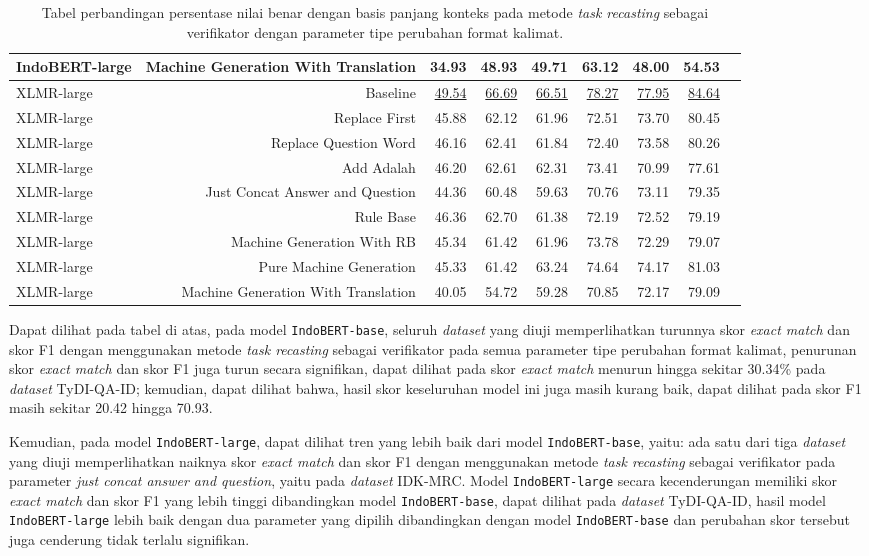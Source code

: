 \begin{table}[H]
\begin{tabular}{lrrrrrrrr}
IndoBERT-large &Machine Generation With Translation &34.93 &48.93 &49.71 &63.12 &48.00 &54.53 \\
\hline
XLMR-large &Baseline &\underline{49.54} &\underline{66.69} &\underline{66.51} &\underline{78.27} &\underline{77.95} &\underline{84.64} \\
XLMR-large &Replace First &45.88 &62.12 &61.96 &72.51 &73.70 &80.45 \\
XLMR-large &Replace Question Word &46.16 &62.41 &61.84 &72.40 &73.58 &80.26 \\
XLMR-large &Add Adalah &46.20 &62.61 &62.31 &73.41 &70.99 &77.61 \\
XLMR-large &Just Concat Answer and Question &44.36 &60.48 &59.63 &70.76 &73.11 &79.35 \\
XLMR-large &Rule Base &46.36 &62.70 &61.38 &72.19 &72.52 &79.19 \\
XLMR-large &Machine Generation With RB &45.34 &61.42 &61.96 &73.78 &72.29 &79.07 \\
XLMR-large &Pure Machine Generation &45.33 &61.42 &63.24 &74.64 &74.17 &81.03 \\
XLMR-large &Machine Generation With Translation &40.05 &54.72 &59.28 &70.85 &72.17 &79.09 \\
\bottomrule
\end{tabular}
\caption{Tabel perbandingan persentase nilai benar dengan basis panjang konteks pada metode \emph{task recasting} sebagai verifikator dengan parameter tipe perubahan format kalimat.}
\end{table}

Dapat dilihat pada tabel di atas, pada model \texttt{IndoBERT-base}, seluruh \emph{dataset} yang diuji memperlihatkan turunnya skor \emph{exact match} dan skor F1 dengan menggunakan metode \emph{task recasting} sebagai verifikator pada semua parameter tipe perubahan format kalimat, penurunan skor \emph{exact match} dan skor F1 juga turun secara signifikan, dapat dilihat pada skor \emph{exact match} menurun hingga sekitar 30.34\% pada \emph{dataset} TyDI-QA-ID; kemudian, dapat dilihat bahwa, hasil skor keseluruhan model ini juga masih kurang baik, dapat dilihat pada skor F1 masih sekitar 20.42 hingga 70.93.

Kemudian, pada model \texttt{IndoBERT-large}, dapat dilihat tren yang lebih baik dari model \texttt{IndoBERT-base}, yaitu: ada satu dari tiga \emph{dataset} yang diuji memperlihatkan naiknya skor \emph{exact match} dan skor F1 dengan menggunakan metode \emph{task recasting} sebagai verifikator pada parameter \emph{just concat answer and question}, yaitu pada \emph{dataset} IDK-MRC. Model \texttt{IndoBERT-large} secara kecenderungan memiliki skor \emph{exact match} dan skor F1 yang lebih tinggi dibandingkan model \texttt{IndoBERT-base}, dapat dilihat pada \emph{dataset} TyDI-QA-ID, hasil model \texttt{IndoBERT-large} lebih baik dengan dua parameter yang dipilih dibandingkan dengan model \texttt{IndoBERT-base} dan perubahan skor tersebut juga cenderung tidak terlalu signifikan.

